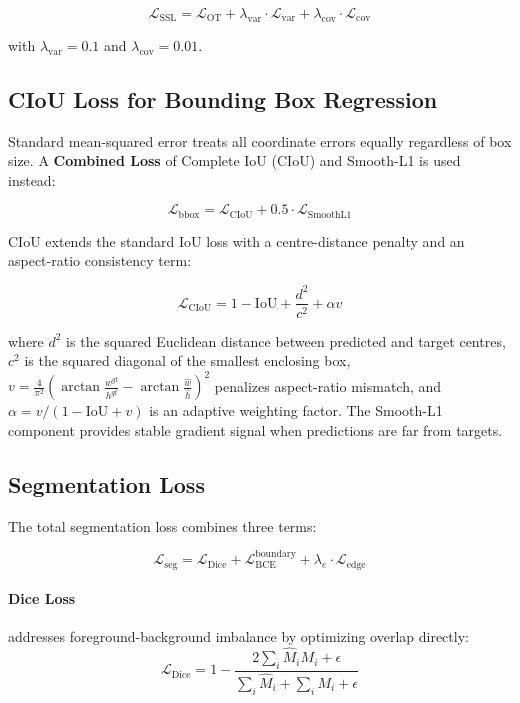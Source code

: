 \begin{equation}
\mathcal{L}_{\text{SSL}} = \mathcal{L}_{\text{OT}} + \lambda_{\text{var}} \cdot \mathcal{L}_{\text{var}} + \lambda_{\text{cov}} \cdot \mathcal{L}_{\text{cov}}
\end{equation}

with $\lambda_{\text{var}} = 0.1$ and $\lambda_{\text{cov}} = 0.01$.

\subsection{CIoU Loss for Bounding Box Regression}

Standard mean-squared error treats all coordinate errors equally regardless of box size. A \textbf{Combined Loss} of Complete IoU (CIoU) and Smooth-L1 is used instead:

\begin{equation}
\mathcal{L}_{\text{bbox}} = \mathcal{L}_{\text{CIoU}} + 0.5 \cdot \mathcal{L}_{\text{SmoothL1}}
\end{equation}

CIoU extends the standard IoU loss with a centre-distance penalty and an aspect-ratio consistency term:

\begin{equation}
\mathcal{L}_{\text{CIoU}} = 1 - \text{IoU} + \frac{d^2}{c^2} + \alpha v
\end{equation}

where $d^2$ is the squared Euclidean distance between predicted and target centres, $c^2$ is the squared diagonal of the smallest enclosing box, $v = \frac{4}{\pi^2}(\arctan\frac{w^{gt}}{h^{gt}} - \arctan\frac{\hat{w}}{\hat{h}})^2$ penalizes aspect-ratio mismatch, and $\alpha = v / (1 - \text{IoU} + v)$ is an adaptive weighting factor. The Smooth-L1 component provides stable gradient signal when predictions are far from targets.

\subsection{Segmentation Loss}

The total segmentation loss combines three terms:

\begin{equation}
\mathcal{L}_{\text{seg}} = \mathcal{L}_{\text{Dice}} + \mathcal{L}_{\text{BCE}}^{\text{boundary}} + \lambda_e \cdot \mathcal{L}_{\text{edge}}
\end{equation}

\paragraph{Dice Loss} addresses foreground-background imbalance by optimizing overlap directly:
\begin{equation}
\mathcal{L}_{\text{Dice}} = 1 - \frac{2\sum_i \hat{M}_i M_i + \epsilon}{\sum_i \hat{M}_i + \sum_i M_i + \epsilon}
\end{equation}

